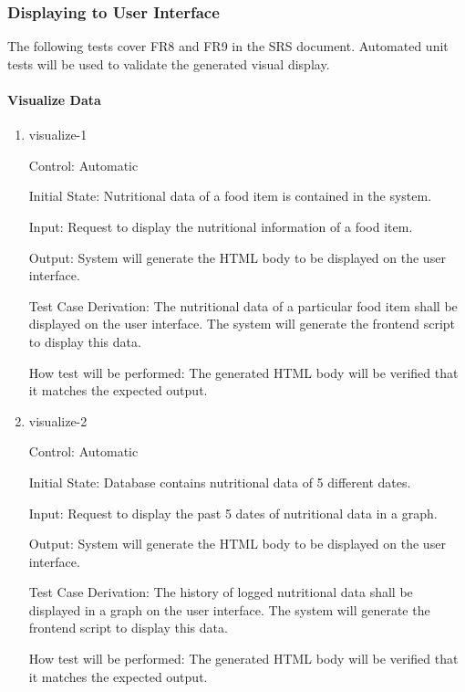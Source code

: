 \documentclass[12pt, titlepage]{article}
\begin{document}
	\subsubsection{Displaying to User Interface}
	
	The following tests cover  FR8 and FR9 in the SRS document. Automated unit tests will be used to validate the generated visual display.
	
	\paragraph{Visualize Data}
	
	\begin{enumerate}
		
		\item{visualize-1\\}
		
		Control: Automatic
		
		Initial State: Nutritional data of a food item is contained in the system.
		
		Input: Request to display the nutritional information of a food item.
		
		Output: System will generate the HTML body to be displayed on the user interface.
		
		Test Case Derivation: The nutritional data of a particular food item shall be displayed on the user interface. The system will generate the frontend script to display this data.
		
		How test will be performed: The generated HTML body will be verified that it matches the expected output.
		
		\item{visualize-2\\}
		
		Control: Automatic
		
		Initial State: Database contains nutritional data of 5 different dates.
		
		Input: Request to display the past 5 dates of nutritional data in a graph.
		
		Output: System will generate the HTML body to be displayed on the user interface.
		
		Test Case Derivation: The history of logged nutritional data shall be displayed in a graph on the user interface. The system will generate the frontend script to display this data.
		
		How test will be performed: The generated HTML body will be verified that it matches the expected output.
		
	\end{enumerate}
	
\end{document}
